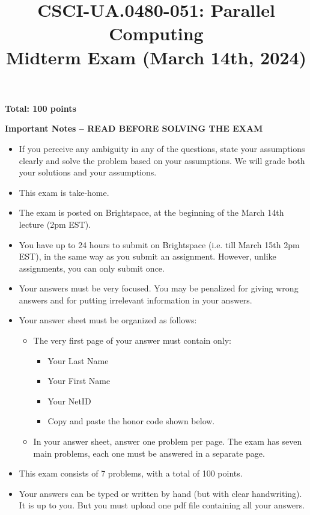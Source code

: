 \documentclass{article}
\title{CSCI-UA.0480-051: Parallel Computing \\ Midterm Exam (March 14th, 2024)}
\author{}
\date{}
\begin{document}
\maketitle

\textbf{Total: 100 points}

\textbf{Important Notes -- READ BEFORE SOLVING THE EXAM}

\begin{itemize}
    \item If you perceive any ambiguity in any of the questions, state your assumptions clearly and solve the problem based on your assumptions. We will grade both your solutions and your assumptions.
    \item This exam is take-home.
    \item The exam is posted on Brightspace, at the beginning of the March 14th lecture (2pm EST).
    \item You have up to 24 hours to submit on Brightspace (i.e. till March 15th 2pm EST), in the same way as you submit an assignment. However, unlike assignments, you can only submit once.
    \item Your answers must be very focused. You may be penalized for giving wrong answers and for putting irrelevant information in your answers.
    \item Your answer sheet must be organized as follows:
    \begin{itemize}
        \item The very first page of your answer must contain only:
        \begin{itemize}
            \item Your Last Name
            \item Your First Name
            \item Your NetID
            \item Copy and paste the honor code shown below.
        \end{itemize}
        \item In your answer sheet, answer one problem per page. The exam has seven main problems, each one must be answered in a separate page.
    \end{itemize}
    \item This exam consists of 7 problems, with a total of 100 points.
    \item Your answers can be typed or written by hand (but with clear handwriting). It is up to you. But you must upload one pdf file containing all your answers.
\end{itemize}
\end{document}
